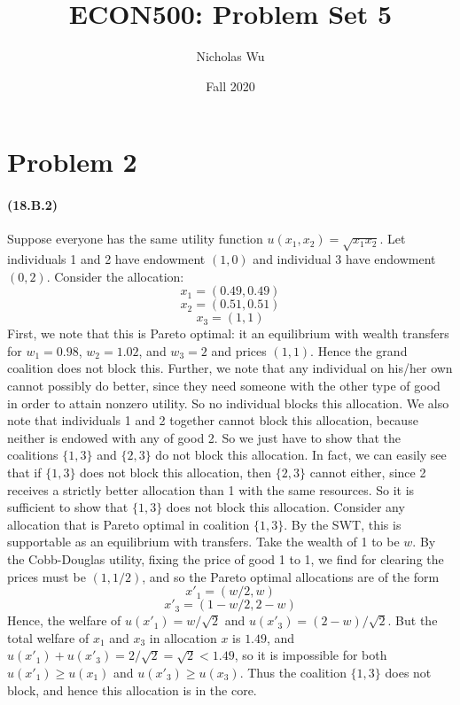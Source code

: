 \documentclass[10pt,letter]{article}
\begin{document}


\title{ECON500: Problem Set 5}

\author{Nicholas Wu}

\date{Fall 2020}

\maketitle


\section*{Problem 2}
\paragraph{(18.B.2)}
Suppose everyone has the same utility function $u(x_1, x_2) = \sqrt{x_1x_2}$. Let individuals 1 and 2 have endowment $(1, 0)$ and individual 3 have endowment $(0, 2)$. Consider the allocation:
\[ x_1 = (0.49, 0.49) \]
\[ x_2 = (0.51, 0.51) \]
\[ x_3 = (1, 1) \]
First, we note that this is Pareto optimal: it an equilibrium with wealth transfers for $w_1 = 0.98$, $w_2 = 1.02$, and $w_3 = 2$ and prices $(1,1)$. Hence the grand coalition does not block this. Further, we note that any individual on his/her own cannot possibly do better, since they need someone with the other type of good in order to attain nonzero utility. So no individual blocks this allocation. We also note that individuals 1 and 2 together cannot block this allocation, because neither is endowed with any of good 2. So we just have to show that the coalitions $\{ 1, 3 \}$ and $\{ 2, 3 \}$ do not block this allocation. In fact, we can easily see that if $\{ 1, 3 \}$ does not block this allocation, then $\{ 2, 3\}$ cannot either, since 2 receives a strictly better allocation than 1 with the same resources. So it is sufficient to show that $\{ 1, 3 \}$ does not block this allocation. Consider any allocation that is Pareto optimal in coalition $\{ 1, 3 \}$.
By the SWT, this is supportable as an equilibrium with transfers. Take the wealth of 1 to be $w$. By the Cobb-Douglas utility, fixing the price of good 1 to 1, we find for clearing the prices must be $(1, 1/2)$, and so the Pareto optimal allocations are of the form
\[ x'_1 = (w/2 , w) \]
\[ x'_3 = (1 - w/2, 2 - w) \]
Hence, the welfare of $u(x'_1) = w / \sqrt{2}$ and $u(x'_3) = (2-w)/\sqrt{2}$. But the total welfare of $x_1$ and $x_3$ in allocation $x$ is $1.49$, and $u(x'_1) + u(x'_3) = 2/\sqrt{2} = \sqrt{2} < 1.49$, so it is impossible for both $u(x'_1) \ge u(x_1)$ and $u(x'_3) \ge u(x_3)$. Thus the coalition $\{ 1, 3 \}$ does not block, and hence this allocation is in the core.
\end{document}
